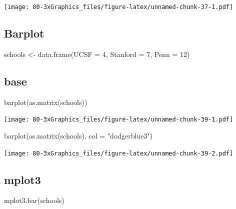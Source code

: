 \documentclass[
]{book}
\newenvironment{Shaded}{\begin{snugshade}}{\end{snugshade}}
\newcommand{\AttributeTok}[1]{\textcolor[rgb]{0.77,0.63,0.00}{#1}}
\newcommand{\DecValTok}[1]{\textcolor[rgb]{0.00,0.00,0.81}{#1}}
\newcommand{\FunctionTok}[1]{\textcolor[rgb]{0.00,0.00,0.00}{#1}}
\newcommand{\NormalTok}[1]{#1}
\newcommand{\OtherTok}[1]{\textcolor[rgb]{0.56,0.35,0.01}{#1}}
\newcommand{\StringTok}[1]{\textcolor[rgb]{0.31,0.60,0.02}{#1}}
\begin{document}
\texttt{[image: 80-3xGraphics\_files/figure-latex/unnamed-chunk-37-1.pdf]}

\hypertarget{barplot-1}{%
\subsection{Barplot}\label{barplot-1}}

\begin{Shaded}
\begin{Highlighting}[]
\NormalTok{schools }\OtherTok{\textless{}{-}} \FunctionTok{data.frame}\NormalTok{(}\AttributeTok{UCSF =} \DecValTok{4}\NormalTok{, }\AttributeTok{Stanford =} \DecValTok{7}\NormalTok{, }\AttributeTok{Penn =} \DecValTok{12}\NormalTok{)}
\end{Highlighting}
\end{Shaded}

\hypertarget{base-5}{%
\subsection{base}\label{base-5}}

\begin{Shaded}
\begin{Highlighting}[]
\FunctionTok{barplot}\NormalTok{(}\FunctionTok{as.matrix}\NormalTok{(schools))}
\end{Highlighting}
\end{Shaded}

\texttt{[image: 80-3xGraphics\_files/figure-latex/unnamed-chunk-39-1.pdf]}

\begin{Shaded}
\begin{Highlighting}[]
\FunctionTok{barplot}\NormalTok{(}\FunctionTok{as.matrix}\NormalTok{(schools), }\AttributeTok{col =} \StringTok{"dodgerblue3"}\NormalTok{)}
\end{Highlighting}
\end{Shaded}

\texttt{[image: 80-3xGraphics\_files/figure-latex/unnamed-chunk-39-2.pdf]}

\hypertarget{mplot3-4}{%
\subsection{\texorpdfstring{\textbf{mplot3}}{mplot3}}\label{mplot3-4}}

\begin{Shaded}
\begin{Highlighting}[]
\FunctionTok{mplot3.bar}\NormalTok{(schools)}
\end{Highlighting}
\end{Shaded}
\end{document}

